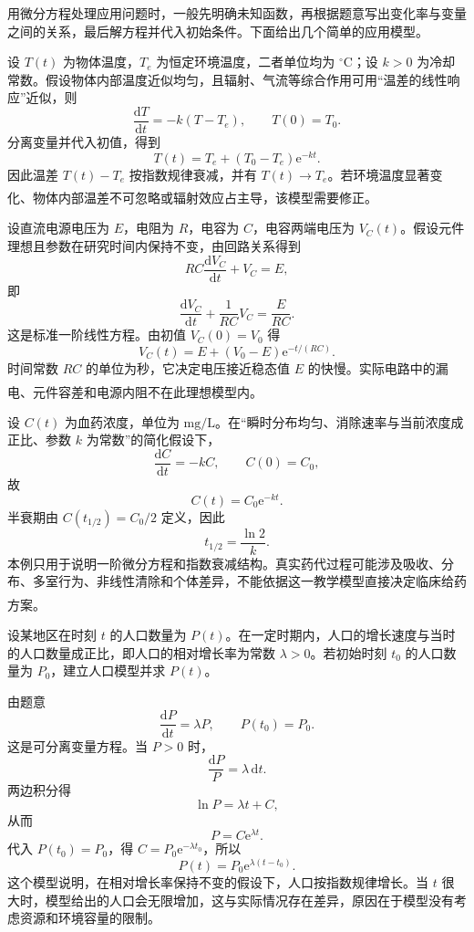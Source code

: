 \documentclass[fontset=fandol]{ctexart}
\newcommand{\dd}{\mathrm{d}}
\newcommand{\ee}{\mathrm{e}}
\newcommand{\upcite}[1]{\textsuperscript{\textsuperscript{\cite{#1}}}}
\begin{document}
用微分方程处理应用问题时，一般先明确未知函数，再根据题意写出变化率与变量之间的关系，最后解方程并代入初始条件。下面给出几个简单的应用模型。

\begin{application}
设 $T(t)$ 为物体温度，$T_e$ 为恒定环境温度，二者单位均为 $^\circ\mathrm C$；设 $k>0$ 为冷却常数。假设物体内部温度近似均匀，且辐射、气流等综合作用可用“温差的线性响应”近似，则
\[
\frac{\dd T}{\dd t}=-k(T-T_e),\qquad T(0)=T_0.
\]
分离变量并代入初值，得到
\[
T(t)=T_e+(T_0-T_e)\ee^{-kt}.
\]
因此温差 $T(t)-T_e$ 按指数规律衰减，并有 $T(t)\to T_e$。若环境温度显著变化、物体内部温差不可忽略或辐射效应占主导，该模型需要修正。\upcite{OpenStaxCalculus2}
\end{application}

\begin{application}[工程：RC 电路的充电过程]
设直流电源电压为 $E$，电阻为 $R$，电容为 $C$，电容两端电压为 $V_C(t)$。假设元件理想且参数在研究时间内保持不变，由回路关系得到
\[
RC\frac{\dd V_C}{\dd t}+V_C=E,
\]
即
\[
\frac{\dd V_C}{\dd t}+\frac1{RC}V_C=\frac{E}{RC}.
\]
这是标准一阶线性方程。由初值 $V_C(0)=V_0$ 得
\[
V_C(t)=E+(V_0-E)\ee^{-t/(RC)}.
\]
时间常数 $RC$ 的单位为秒，它决定电压接近稳态值 $E$ 的快慢。实际电路中的漏电、元件容差和电源内阻不在此理想模型内。\upcite{OpenStaxPhysics2}
\end{application}

\begin{application}[医学：单室一阶药物消除教学模型]
设 $C(t)$ 为血药浓度，单位为 $\mathrm{mg/L}$。在“瞬时分布均匀、消除速率与当前浓度成正比、参数 $k$ 为常数”的简化假设下，
\[
\frac{\dd C}{\dd t}=-kC,\qquad C(0)=C_0,
\]
故
\[
C(t)=C_0\ee^{-kt}.
\]
半衰期由 $C(t_{1/2})=C_0/2$ 定义，因此
\[
t_{1/2}=\frac{\ln2}{k}.
\]
本例只用于说明一阶微分方程和指数衰减结构。真实药代过程可能涉及吸收、分布、多室行为、非线性清除和个体差异，不能依据这一教学模型直接决定临床给药方案。\upcite{RowlandTozer}
\end{application}

\begin{example}
设某地区在时刻 $t$ 的人口数量为 $P(t)$。在一定时期内，人口的增长速度与当时的人口数量成正比，即人口的相对增长率为常数 $\lambda>0$。若初始时刻 $t_0$ 的人口数量为 $P_0$，建立人口模型并求 $P(t)$。

由题意
\[
\frac{\dd P}{\dd t}=\lambda P,\qquad P(t_0)=P_0.
\]
这是可分离变量方程。当 $P>0$ 时，
\[
\frac{\dd P}{P}=\lambda\,\dd t.
\]
两边积分得
\[
\ln P=\lambda t+C,
\]
从而
\[
P=C\ee^{\lambda t}.
\]
代入 $P(t_0)=P_0$，得 $C=P_0\ee^{-\lambda t_0}$，所以
\[
P(t)=P_0\ee^{\lambda(t-t_0)}.
\]
这个模型说明，在相对增长率保持不变的假设下，人口按指数规律增长。当 $t$ 很大时，模型给出的人口会无限增加，这与实际情况存在差异，原因在于模型没有考虑资源和环境容量的限制。
\end{example}
\end{document}
